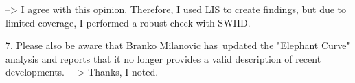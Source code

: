 --> I agree with this opinion. Therefore, I used LIS to create findings, but due to limited coverage, I performed a robust check with SWIID.

7. Please also be aware that Branko Milanovic has updated the "Elephant Curve" analysis and reports that it no longer provides a valid description of recent developments. 
--> Thanks, I noted.




 